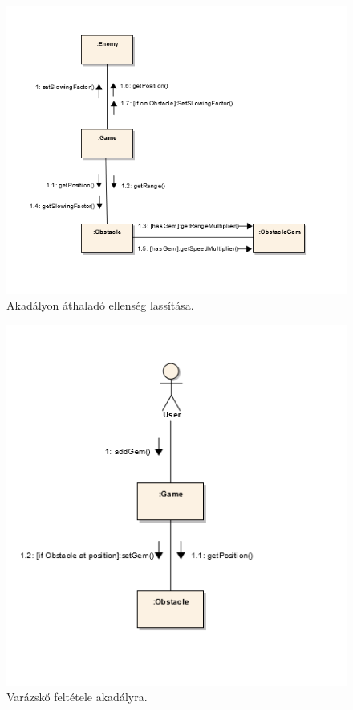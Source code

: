 \begin{figure}[H]
\begin{center}
\includegraphics{images/ch05/slowKomm.png}
\caption{Akadályon áthaladó ellenség lassítása.}
\label{fig:slowKomm}
\end{center}
\end{figure}

\begin{figure}[H]
\begin{center}
\includegraphics{images/ch05/addGemToObKomm.png}
\caption{Varázskő feltétele akadályra.}
\label{fig:addGemToObKomm}
\end{center}
\end{figure}


